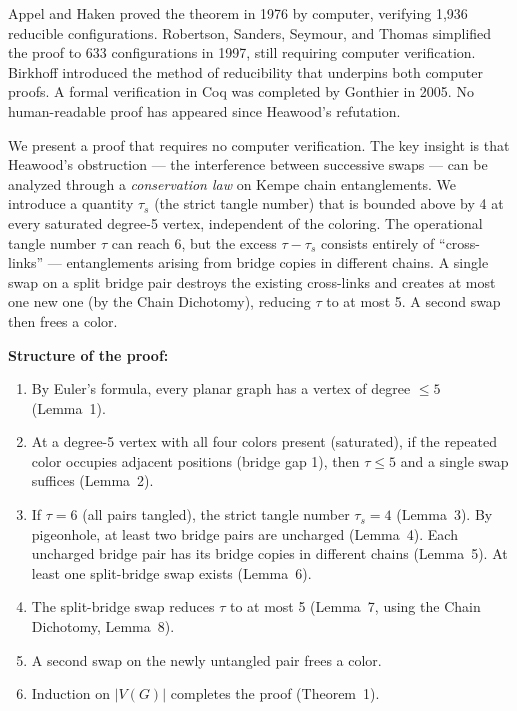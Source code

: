 \documentclass[11pt]{article}
\theoremstyle{remark}
\begin{document}
Appel and Haken \cite{appel1977} proved the theorem in 1976 by computer, verifying 1,936 reducible configurations. Robertson, Sanders, Seymour, and Thomas \cite{robertson1997} simplified the proof to 633 configurations in 1997, still requiring computer verification. Birkhoff \cite{birkhoff1913} introduced the method of reducibility that underpins both computer proofs. A formal verification in Coq was completed by Gonthier \cite{gonthier2008} in 2005. No human-readable proof has appeared since Heawood's refutation.

We present a proof that requires no computer verification. The key insight is that Heawood's obstruction --- the interference between successive swaps --- can be analyzed through a \emph{conservation law} on Kempe chain entanglements. We introduce a quantity $\tau_s$ (the strict tangle number) that is bounded above by 4 at every saturated degree-5 vertex, independent of the coloring. The operational tangle number $\tau$ can reach 6, but the excess $\tau - \tau_s$ consists entirely of ``cross-links'' --- entanglements arising from bridge copies in different chains. A single swap on a split bridge pair destroys the existing cross-links and creates at most one new one (by the Chain Dichotomy), reducing $\tau$ to at most 5. A second swap then frees a color.

\medskip
\noindent\textbf{Structure of the proof:}
\begin{enumerate}[label=\arabic*.]
  \item By Euler's formula, every planar graph has a vertex of degree $\leq 5$ (Lemma~1).
  \item At a degree-5 vertex with all four colors present (saturated), if the repeated color occupies adjacent positions (bridge gap 1), then $\tau \leq 5$ and a single swap suffices (Lemma~2).
  \item If $\tau = 6$ (all pairs tangled), the strict tangle number $\tau_s = 4$ (Lemma~3). By pigeonhole, at least two bridge pairs are uncharged (Lemma~4). Each uncharged bridge pair has its bridge copies in different chains (Lemma~5). At least one split-bridge swap exists (Lemma~6).
  \item The split-bridge swap reduces $\tau$ to at most 5 (Lemma~7, using the Chain Dichotomy, Lemma~8).
  \item A second swap on the newly untangled pair frees a color.
  \item Induction on $|V(G)|$ completes the proof (Theorem~1).
\end{enumerate}
\end{document}
